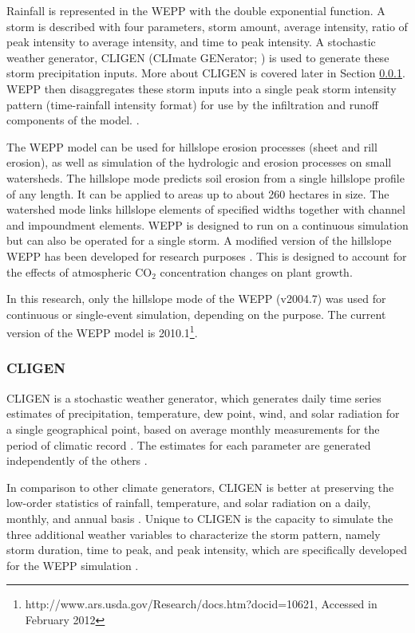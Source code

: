 Rainfall is represented in the WEPP with the double exponential function. A
storm is described with four parameters, storm amount, average intensity, ratio
of peak intensity to average intensity, and time to peak intensity. A stochastic
weather generator, CLIGEN (CLImate GENerator; \citealp{nicks1995-2}) is used to
generate these storm precipitation inputs. More about CLIGEN is covered later in
Section \ref{sec:ClimateGeneratorCLIGEN}. WEPP then disaggregates these storm
inputs into a single peak storm intensity pattern (time-rainfall intensity
format) for use by the infiltration and runoff components of the model.
\citep{flanagan1995-usda}.

The WEPP model can be used for hillslope erosion processes (sheet and rill
erosion), as well as simulation of the hydrologic and erosion processes on small
watersheds. The hillslope mode predicts soil erosion from a single hillslope
profile of any length. It can be applied to areas up to about 260 hectares in
size. The watershed mode links hillslope elements of specified widths together
with channel and impoundment elements. WEPP is designed to run on a continuous
simulation but can also be operated for a single storm. A modified version of
the hillslope WEPP has been developed for research purposes
\citep{favis-mortlock1999-329,favis-mortlock1996-529}. This is designed to
account for the effects of atmospheric CO$_2$ concentration changes on plant
growth.

In this research, only the hillslope mode of the WEPP (v2004.7) was used for
continuous or single-event simulation, depending on the purpose. The current
version of the WEPP model is
2010.1\footnote{http://www.ars.usda.gov/Research/docs.htm?docid=10621, Accessed
in February 2012}.

\subsubsection{CLIGEN}
\label{sec:ClimateGeneratorCLIGEN}
CLIGEN is a stochastic weather generator, which generates daily time series
estimates of precipitation, temperature, dew point, wind, and solar radiation
for a single geographical point, based on average monthly measurements for the
period of climatic record \citep{nicks1995-2}. The estimates for each parameter
are generated independently of the others \citep{nicks1995-2}.

In comparison to other climate generators, CLIGEN is better at preserving the
low-order statistics of rainfall, temperature, and solar radiation on a daily,
monthly, and annual basis \citep{nicks1995-2}. Unique to CLIGEN is the capacity
to simulate the three additional weather variables to characterize the storm
pattern, namely storm duration, time to peak, and peak intensity, which are
specifically developed for the WEPP simulation \citep{flanagan1995-usda}.

